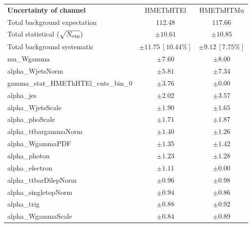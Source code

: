 
\begin{table}
\begin{center}
\setlength{\tabcolsep}{0.0pc}
\begin{tabular*}{\textwidth}{@{\extracolsep{\fill}}lcc}
\noalign{\smallskip}\hline\noalign{\smallskip}
{\bf Uncertainty of channel}                                    & HMEThHTEl            & HMEThHTMu            \\
\noalign{\smallskip}\hline\noalign{\smallskip}
Total background expectation             &  $112.48$        &  $117.66$       \\
\noalign{\smallskip}\hline\noalign{\smallskip}
Total statistical $(\sqrt{N_{\rm exp}})$              & $\pm 10.61$        & $\pm 10.85$       \\
Total background systematic               & $\pm 11.75\ [10.44\%] $        & $\pm 9.12\ [7.75\%] $             \\
\noalign{\smallskip}\hline\noalign{\smallskip}
\noalign{\smallskip}\hline\noalign{\smallskip}
mu\_Wgamma         & $\pm 7.60$          & $\pm 8.00$       \\
alpha\_WjetsNorm         & $\pm 5.81$          & $\pm 7.34$       \\
gamma\_stat\_HMEThHTEl\_cuts\_bin\_0         & $\pm 3.76$          & $\pm 0.00$       \\
alpha\_jes         & $\pm 2.02$          & $\pm 3.57$       \\
alpha\_WjetsScale         & $\pm 1.90$          & $\pm 1.65$       \\
alpha\_phoScale         & $\pm 1.71$          & $\pm 1.87$       \\
alpha\_ttbargammaNorm         & $\pm 1.40$          & $\pm 1.26$       \\
alpha\_WgammaPDF         & $\pm 1.35$          & $\pm 1.42$       \\
alpha\_photon         & $\pm 1.23$          & $\pm 1.28$       \\
alpha\_electron         & $\pm 1.11$          & $\pm 0.00$       \\
alpha\_ttbarDilepNorm         & $\pm 0.96$          & $\pm 0.98$       \\
alpha\_singletopNorm         & $\pm 0.94$          & $\pm 0.86$       \\
alpha\_trig         & $\pm 0.88$          & $\pm 0.92$       \\
alpha\_WgammaScale         & $\pm 0.84$          & $\pm 0.89$       \\

\end{tabular*}
\end{center}
\end{table}
